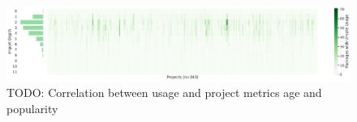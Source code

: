\begin{figure}[htp!]
    \centering
    \includegraphics[width=\textwidth]{assets/plots/chapter4/unsafe-import-depth.pdf}
    \caption{TODO: Correlation between \unsafe{} usage and project metrics age and popularity}
    \label{fig:correlation-popularity}
\end{figure}
